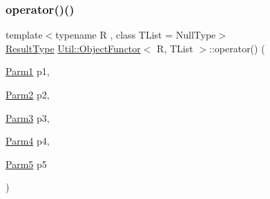 \subsubsection{\texorpdfstring{operator()()}{operator()()}\hspace{0.1cm}{\footnotesize\ttfamily [17/18]}}
{\footnotesize\ttfamily template$<$typename R , class T\+List  = Null\+Type$>$ \\
\mbox{\hyperlink{classUtil_1_1ObjectFunctor_a77f816e98108848347d0dfc085090a1c}{Result\+Type}} \mbox{\hyperlink{classUtil_1_1ObjectFunctor}{Util\+::\+Object\+Functor}}$<$ R, T\+List $>$\+::operator() (\begin{DoxyParamCaption}\item[{\mbox{\hyperlink{classUtil_1_1ObjectFunctor_a199715d28029627c2ae7219c13b04d26}{Parm1}}}]{p1,  }\item[{\mbox{\hyperlink{classUtil_1_1ObjectFunctor_a6809cf65883dc7575e01d9b9849649cf}{Parm2}}}]{p2,  }\item[{\mbox{\hyperlink{classUtil_1_1ObjectFunctor_a6becd26610c6091b9ba93cd96f3def66}{Parm3}}}]{p3,  }\item[{\mbox{\hyperlink{classUtil_1_1ObjectFunctor_a54ce0b64981cd7f558ce8eea7df3f1b2}{Parm4}}}]{p4,  }\item[{\mbox{\hyperlink{classUtil_1_1ObjectFunctor_a8428e04dd3fb91bc7f7c518a1771eecb}{Parm5}}}]{p5 }\end{DoxyParamCaption})\hspace{0.3cm}{\ttfamily [inline]}}

\mbox{\label{classUtil_1_1ObjectFunctor_a95b7e08a92f54e2ce8a90153c1414abd}} 
